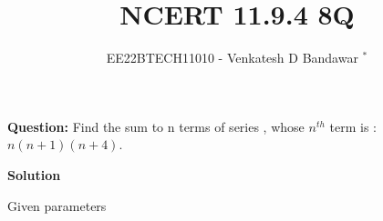 \documentclass[journal,12pt,twocolumn]{IEEEtran}
\theoremstyle{remark}
\begin{document}

\vspace{3cm}

\title{NCERT 11.9.4 8Q}
\author{EE22BTECH11010 - Venkatesh D Bandawar $^{*}$%
}
\maketitle
\bigskip

\renewcommand{\thefigure}{\theenumi}
\renewcommand{\thetable}{\theenumi}

\textbf{Question:} Find the sum to n terms of series , whose $n^{th}$ term is : $n(n+1)(n+4)$.

\textbf{Solution}
\begin{table}[!h] 
\centering

\caption{Given parameters}
\label{given parameters list}
\end{table}
\end{document}

